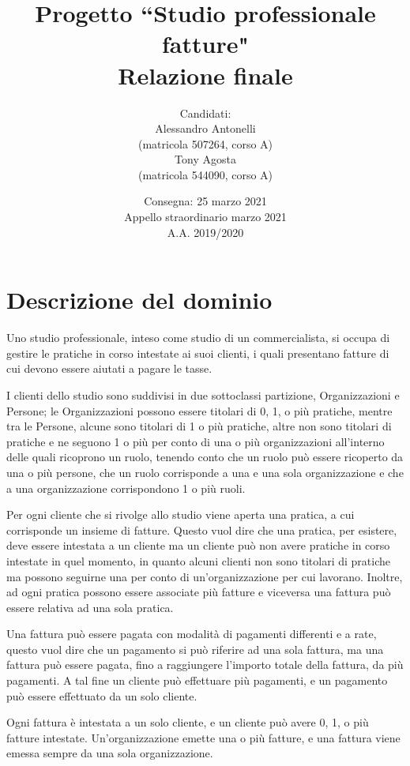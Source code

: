 \documentclass[a4paper,12pt]{article}
\title { \vspace{-1.0cm}{\small Università di Pisa\\Dipartimento di Informatica\\Corso di Laurea in Informatica\\[0.5cm]Corso di Basi di Dati (244AA), prof. Giorgio Ghelli\\[0.7cm]}Progetto ``Studio professionale fatture"\\Relazione finale }
\author { Candidati:\\Alessandro Antonelli\\(matricola 507264, corso A)\\Tony Agosta\\(matricola 544090, corso A)}
\date { Consegna: 25 marzo 2021\\Appello straordinario marzo 2021\\A.A. 2019/2020 }
\begin{document}
 \maketitle
 
 \tableofcontents

\listoffigures

\lstlistoflistings

 \clearpage
 

 \section{ Descrizione del dominio }

Uno studio professionale, inteso come studio di un commercialista, si occupa di gestire le pratiche in corso intestate ai suoi clienti, i quali presentano fatture di cui devono essere aiutati a pagare le tasse.

I clienti dello studio sono suddivisi in due sottoclassi partizione, Organizzazioni e Persone; le Organizzazioni possono essere titolari di 0, 1, o più pratiche, mentre tra le Persone, alcune sono titolari di 1 o più pratiche, altre non sono titolari di pratiche e ne seguono 1 o più per conto di una o più organizzazioni all’interno delle quali ricoprono un ruolo, tenendo conto che un ruolo può essere ricoperto da una o più persone, che un ruolo corrisponde a una e una sola organizzazione e che a una organizzazione corrispondono 1 o più ruoli.

Per ogni cliente che si rivolge allo studio viene aperta una pratica, a cui corrisponde un insieme di fatture. Questo vuol dire che una pratica, per esistere, deve essere intestata a un cliente ma un cliente può non avere pratiche in corso intestate in quel momento, in quanto alcuni clienti non sono titolari di pratiche ma possono seguirne una per conto di un’organizzazione per cui lavorano. Inoltre, ad ogni pratica possono essere associate più fatture e viceversa una fattura può essere relativa ad una sola pratica.

Una fattura può essere pagata con modalità di pagamenti differenti e a rate, questo vuol dire che un pagamento si può riferire ad una sola  fattura, ma una fattura può essere pagata, fino a raggiungere l’importo totale della fattura, da più pagamenti. A tal fine un cliente può effettuare più pagamenti, e un pagamento può essere effettuato da un solo cliente.

Ogni fattura è intestata a un solo cliente, e un cliente può avere 0, 1, o più fatture intestate. Un’organizzazione emette una o più fatture, e una fattura viene emessa sempre da una sola organizzazione.
\end{document}
